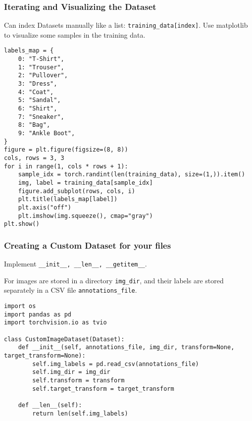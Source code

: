 \begin{frame}[fragile]
\frametitle{Iterating and Visualizing the Dataset}

Can index Datasets manually like a list: \lstinline|training_data[index]|.
Use matplotlib to visualize some samples in the training data.

\begin{lstlisting}
labels_map = {
    0: "T-Shirt",
    1: "Trouser",
    2: "Pullover",
    3: "Dress",
    4: "Coat",
    5: "Sandal",
    6: "Shirt",
    7: "Sneaker",
    8: "Bag",
    9: "Ankle Boot",
}
figure = plt.figure(figsize=(8, 8))
cols, rows = 3, 3
for i in range(1, cols * rows + 1):
    sample_idx = torch.randint(len(training_data), size=(1,)).item()
    img, label = training_data[sample_idx]
    figure.add_subplot(rows, cols, i)
    plt.title(labels_map[label])
    plt.axis("off")
    plt.imshow(img.squeeze(), cmap="gray")
plt.show()
\end{lstlisting}

\end{frame} 

\begin{frame}[fragile]
\frametitle{Creating a Custom Dataset for your files}

Implement \lstinline|__init__, __len__, __getitem__|.

For images are stored in a directory \lstinline|img_dir|, and their labels are stored separately in a CSV file \lstinline|annotations_file|.

\begin{lstlisting}
import os
import pandas as pd
import torchvision.io as tvio

class CustomImageDataset(Dataset):
    def __init__(self, annotations_file, img_dir, transform=None, target_transform=None):
        self.img_labels = pd.read_csv(annotations_file)
        self.img_dir = img_dir
        self.transform = transform
        self.target_transform = target_transform

    def __len__(self):
        return len(self.img_labels)

\end{lstlisting}

\end{frame} 

